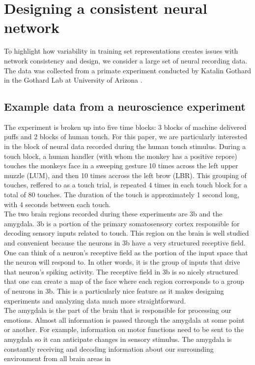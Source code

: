 \documentclass[12pt]{article}
\begin{document}
\section{Designing a consistent neural network}
To highlight how variability in training set representations creates issues with network consistency and design, we consider a large set of neural recording data. The data was collected from a primate experiment conducted by Katalin Gothard in the Gothard Lab at University
of Arizona \cite{lab}.
\subsection{Example data from a neuroscience experiment}The experiment is broken up into five time blocks: 3 blocks of machine delivered puffs and 2 blocks of human touch. For this paper, we are particularly interested in the block of neural data recorded during the human touch stimulus. During a touch block, a human handler (with whom the monkey has a positive repore) touches the monkeys face in a sweeping gesture 10 times across the left upper muzzle (LUM), and then 10 times accross the left brow (LBR). This grouping of touches, reffered to as a touch trial, is repeated 4 times in each touch block for a total of 80 touches. The duration of the touch is approximately 1 second long, with 4 seconds between each touch.  \\
\indent The two brain regions recorded during these experiments are 3b and the amygdala. 3b is a portion of the primary somatosensory cortex responsible for decoding sensory inputs related to touch. This region on the brain is well studied and convenient because the neurons in 3b have a very structured receptive field. One can think of a neuron's receptive field as the portion of the input space that the neuron will respond to. In other words, it is the group of inputs that drive that neuron's spiking activity. The receptive field in 3b is so nicely structured that one can create a map of the face where each region corresponds to a group of neurons in 3b. This is a particularly nice feature as it makes designing experiments and analyzing data much more straightforward. \\
\indent The amygdala is the part of the brain that is responsible for processing our
emotions. Almost all information is passed through the amygdala at some point or
another. For example, information on motor functions need to be sent to the amygdala
so it can anticipate changes in sensory stimulus. The amygdala is
constantly receiving and decoding information about our surrounding environment from all brain areas in
\end{document}
